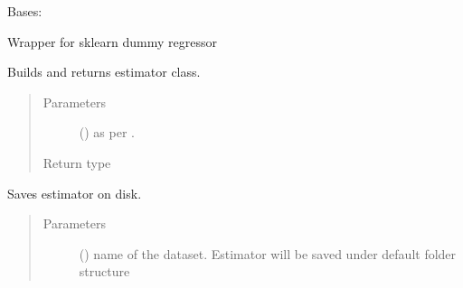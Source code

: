 \documentclass[letterpaper,10pt,english]{sphinxmanual}
\begin{document}

\begin{fulllineitems}
\label{\detokenize{estimators:mleap.estimators.baseline_estimators.Baseline_Regressor}}
Bases: {\hyperref[\detokenize{estimators:mleap.estimators.mleap_estimator.MleapEstimator}]{}}

Wrapper for sklearn dummy regressor

\begin{fulllineitems}
\label{\detokenize{estimators:mleap.estimators.baseline_estimators.Baseline_Regressor.build}}
Builds and returns estimator class.
\begin{quote}\begin{description}
\item[{Parameters}] \leavevmode
{} () \textendash{} as per .

\item[{Return type}] \leavevmode
{}

\end{description}\end{quote}

\end{fulllineitems}


\begin{fulllineitems}
\label{\detokenize{estimators:mleap.estimators.baseline_estimators.Baseline_Regressor.save}}
Saves estimator on disk.
\begin{quote}\begin{description}
\item[{Parameters}] \leavevmode
{} () \textendash{} name of the dataset. Estimator will be saved under default folder structure 

\end{description}\end{quote}

\end{fulllineitems}


\end{fulllineitems}
\end{document}
